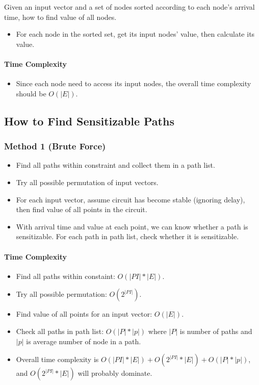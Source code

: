 \documentclass[]{article}
\providecommand{\tightlist}{%
  \setlength{\itemsep}{0pt}\setlength{\parskip}{0pt}}
\let\oldparagraph\paragraph
\renewcommand{\paragraph}[1]{\oldparagraph{#1}\mbox{}}
\begin{document}
Given an input vector and a set of nodes sorted according to each node's
arrival time, how to find value of all nodes.

\begin{itemize}
\tightlist
\item
  For each node in the sorted set, get its input nodes' value, then
  calculate its value.
\end{itemize}

\paragraph{Time Complexity}\label{time-complexity-3}

\begin{itemize}
\tightlist
\item
  Since each node need to access its input nodes, the overall time
  complexity should be \(O(|E|)\).
\end{itemize}

\subsection{How to Find Sensitizable
Paths}\label{how-to-find-sensitizable-paths}

\subsubsection{Method 1 (Brute Force)}\label{method-1-brute-force}

\begin{itemize}
\item
  Find all paths within constraint and collect them in a path list.
\item
  Try all possible permutation of input vectors.
\item
  For each input vector, assume circuit has become stable (ignoring
  delay), then find value of all points in the circuit.
\item
  With arrival time and value at each point, we can know whether a path
  is sensitizable. For each path in path list, check whether it is
  sensitizable.
\end{itemize}

\paragraph{Time Complexity}\label{time-complexity-4}

\begin{itemize}
\item
  Find all paths within constaint: \(O(|PI| * |E|)\).
\item
  Try all possible permutation: \(O(2^|PI|)\).
\item
  Find value of all points for an input vector: \(O(|E|)\).
\item
  Check all paths in path list: \(O(|P| * |p|)\) where \(|P|\) is number
  of paths and \(|p|\) is average number of node in a path.
\item
  Overall time complexity is
  \(O(|PI| * |E|) + O(2^|PI| * |E|) +  O(|P| * |p|)\), and
  \(O(2^|PI| * |E|)\) will probably dominate.
\end{itemize}
\end{document}
